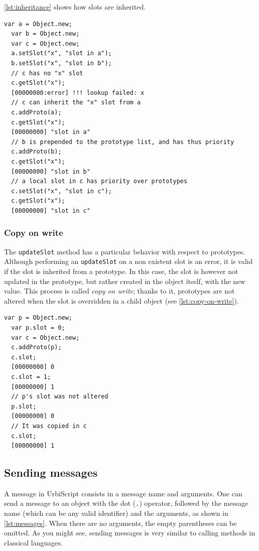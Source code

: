 \documentclass[openright,twoside,12pt]{report}
\newcommand{\us}{UrbiScript\xspace}
\newcommand   {\floatpos}          {htbp}
\newcommand{\lst}[1]{\autoref{lst:#1}}
\begin{document}
\lst{inheritance} shows how slots are inherited.

\begin{lstlisting}[caption=Slots inheritance, label=lst:inheritance,
  float=\floatpos]
  var a = Object.new;
  var b = Object.new;
  var c = Object.new;
  a.setSlot("x", "slot in a");
  b.setSlot("x", "slot in b");
  // c has no "x" slot
  c.getSlot("x");
  [00000000:error] !!! lookup failed: x
  // c can inherit the "x" slot from a
  c.addProto(a);
  c.getSlot("x");
  [00000000] "slot in a"
  // b is prepended to the prototype list, and has thus priority
  c.addProto(b);
  c.getSlot("x");
  [00000000] "slot in b"
  // a local slot in c has priority over prototypes
  c.setSlot("x", "slot in c");
  c.getSlot("x");
  [00000000] "slot in c"
\end{lstlisting}

\subsubsection{Copy on write}

The \lstinline|updateSlot| method has a particular behavior with
respect to prototypes. Although performing an \lstinline|updateSlot|
on a non existent slot is an error, it is valid if the slot is
inherited from a prototype. In this case, the slot is however not
updated in the prototype, but rather created in the object itself,
with the new value. This process is called {\em copy on write}; thanks
to it, prototypes are not altered when the slot is overridden in a
child object (see \lst{copy-on-write}).

\begin{lstlisting}[caption=Copy on write, label=lst:copy-on-write,
  float=\floatpos]
  var p = Object.new;
  var p.slot = 0;
  var c = Object.new;
  c.addProto(p);
  c.slot;
  [00000000] 0
  c.slot = 1;
  [00000000] 1
  // p's slot was not altered
  p.slot;
  [00000000] 0
  // It was copied in c
  c.slot;
  [00000000] 1
\end{lstlisting}

\subsection{Sending messages}

A message in \us consists in a message name and arguments. One can
send a message to an object with the dot (\lstinline|.|) operator,
followed by the message name (which can be any valid identifier) and
the arguments, as shown in \lst{messages}. When there are no
arguments, the empty parentheses can be omitted. As you might see,
sending messages is very similar to calling methods in classical
languages.
\end{document}
